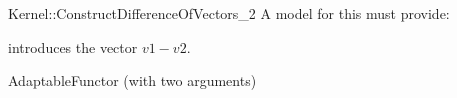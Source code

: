 \begin{ccRefFunctionObjectConcept}{Kernel::ConstructDifferenceOfVectors_2}
A model for this must provide:


            {introduces the vector $v1 - v2$.}

\ccRefines
AdaptableFunctor (with two arguments)

\ccSeeAlso
{}\\

\end{ccRefFunctionObjectConcept}
